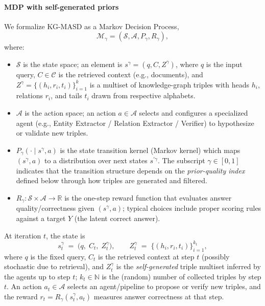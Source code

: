 \documentclass[preprint,12pt]{elsarticle}
\def\textit#1{#1}%
\begin{document}
\paragraph{MDP with self-generated priors}
We formalize KG-MASD as a Markov Decision Process,
\[
\mathcal{M}_\gamma=(\mathcal{S},\mathcal{A},P_\gamma,R_\gamma),
\]
where:
\begin{itemize}
\item $\mathcal{S}$ is the state space; an element is $s^\gamma=(q,C,Z^\gamma)$, where
      $q$ is the input query, $C\in\mathcal{C}$ is the retrieved context (e.g., documents),
      and $Z^\gamma=\{(h_i,r_i,t_i)\}_{i=1}^{k}$ is a multiset of knowledge-graph triples
      with heads $h_i$, relations $r_i$, and tails $t_i$ drawn from respective alphabets.
\item $\mathcal{A}$ is the action space; an action $a\in\mathcal{A}$ selects and configures
      a specialized agent (e.g., Entity Extractor / Relation Extractor / Verifier) to hypothesize or validate new triples.
\item $P_\gamma(\cdot\mid s^\gamma,a)$ is the state transition kernel (Markov kernel) which
      maps $(s^\gamma,a)$ to a distribution over next states $s^{\prime\gamma}$.
      The subscript $\gamma\in[0,1]$ indicates that the transition structure depends on the
      \emph{prior-quality index} defined below through how triples are generated and filtered.
\item $R_\gamma:\mathcal{S}\times\mathcal{A}\to\mathbb{R}$ is the one-step reward function that evaluates
      answer quality/correctness given $(s^\gamma,a)$; typical choices include proper scoring rules against a target $Y$ (the latent correct answer).
\end{itemize}

At iteration $t$, the state is
\begin{equation}
s_t^\gamma \;=\; \bigl(q,\; C_t,\; Z_t^\gamma\bigr),
\qquad
Z_t^\gamma \;=\; \{(h_i,r_i,t_i)\}_{i=1}^{k_t},
\label{eq:s-t-gamma-extended}
\end{equation}
\textit{where} $q$ is the fixed query, $C_t$ is the retrieved context at step $t$ (possibly stochastic due to retrieval),
and $Z_t^\gamma$ is the \emph{self-generated} triple multiset inferred by the agents up to step $t$;
$k_t\in\mathbb{N}$ is the (random) number of collected triples by step $t$.
An action $a_t\in\mathcal{A}$ selects an agent/pipeline to propose or verify new triples,
and the reward $r_t=R_\gamma(s_t^\gamma,a_t)$ measures answer correctness at that step.
\end{document}
